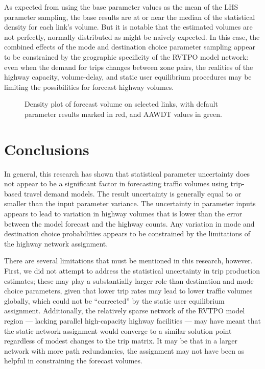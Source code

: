 \documentclass[
  letterpaper,
  number,
  review,
  3p]{elsarticle}
\begin{document}
As expected from using the base parameter values as the mean of the LHS
parameter sampling, the base results are at or near the median of the
statistical density for each link's volume. But it is notable that the
estimated volumes are not perfectly, normally distributed as might be
naively expected. In this case, the combined effects of the mode and
destination choice parameter sampling appear to be constrained by the
geographic specificity of the RVTPO model network: even when the demand
for trips changes between zone pairs, the realities of the highway
capacity, volume-delay, and static user equilibrium procedures may be
limiting the possibilities for forecast highway volumes.

\begin{figure}


\caption{\label{fig-densityplots}Density plot of forecast volume on
selected links, with default parameter results marked in red, and AAWDT
values in green.}

\end{figure}%


\section{Conclusions}\label{sec-conclusions}

In general, this research has shown that statistical parameter
uncertainty does not appear to be a significant factor in forecasting
traffic volumes using trip-based travel demand models. The result
uncertainty is generally equal to or smaller than the input parameter
variance. The uncertainty in parameter inputs appears to lead to
variation in highway volumes that is lower than the error between the
model forecast and the highway counts. Any variation in mode and
destination choice probabilities appears to be constrained by the
limitations of the highway network assignment.

There are several limitations that must be mentioned in this research,
however. First, we did not attempt to address the statistical
uncertainty in trip production estimates; these may play a substantially
larger role than destination and mode choice parameters, given that
lower trip rates may lead to lower traffic volumes globally, which could
not be ``corrected'' by the static user equilibrium assignment.
Additionally, the relatively sparse network of the RVTPO model region
--- lacking parallel high-capacity highway facilities --- may have meant
that the static network assignment would converge to a similar solution
point regardless of modest changes to the trip matrix. It may be that in
a larger network with more path redundancies, the assignment may not
have been as helpful in constraining the forecast volumes.
\end{document}
